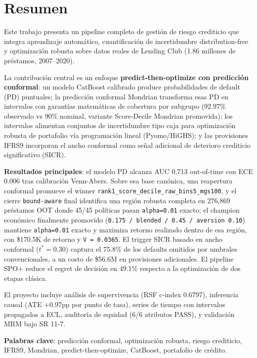 \documentclass[
  spanish,
  11pt,
  letterpaper,
]{scrbook}
\theoremstyle{plain}
\theoremstyle{remark}
\begin{document}
\section*{Resumen}\label{resumen}


Este trabajo presenta un pipeline completo de gestión de riesgo
crediticio que integra aprendizaje automático, cuantificación de
incertidumbre distribution-free y optimización robusta sobre datos
reales de Lending Club (1.86 millones de préstamos, 2007--2020).

La contribución central es un enfoque \textbf{predict-then-optimize con
predicción conformal}: un modelo CatBoost calibrado produce
probabilidades de default (PD) puntuales; la predicción conformal
Mondrian transforma esas PD en intervalos con garantías matemáticas de
cobertura por subgrupo (92.97\% observado vs 90\% nominal, variante
Score-Decile Mondrian promovida); los intervalos alimentan conjuntos de
incertidumbre tipo caja para optimización robusta de portafolio vía
programación lineal (Pyomo/HiGHS); y las provisiones IFRS9 incorporan el
ancho conformal como señal adicional de deterioro crediticio
significativo (SICR).

\textbf{Resultados principales}: el modelo PD alcanza AUC 0.713
out-of-time con ECE 0.006 tras calibración Venn-Abers. Sobre esa base
canónica, una reapertura conformal promueve el winner
\texttt{rank1\_score\_decile\_raw\_bins5\_mgs100}, y el cierre
\texttt{bound-aware} final identifica una región robusta completa en
276,869 préstamos OOT donde 45/45 políticas pasan \texttt{alpha=0.01}
exacto; el champion económico finalmente promovido
(\texttt{0.175\ /\ blended\ /\ 0.45\ /\ aversion\ 0.10}) mantiene
\texttt{alpha=0.01} exacto y maximiza retorno realizado dentro de esa
región, con \$170.5K de retorno y \texttt{V\ =\ 0.0365}. El trigger SICR
basado en ancho conformal (\(t^* = 0.30\)) captura el 75.8\% de los
defaults omitidos por umbrales convencionales, a un costo de \$56.6M en
provisiones adicionales. El pipeline SPO+ reduce el regret de decisión
en 49.1\% respecto a la optimización de dos etapas clásica.

El proyecto incluye análisis de supervivencia (RSF c-index 0.6797),
inferencia causal (ATE +0.97pp por punto de tasa), series de tiempo con
intervalos propagados a ECL, auditoría de equidad (6/6 atributos PASS),
y validación MRM bajo SR 11-7.

\textbf{Palabras clave}: predicción conformal, optimización robusta,
riesgo crediticio, IFRS9, Mondrian, predict-then-optimize, CatBoost,
portafolio de crédito.
\end{document}
